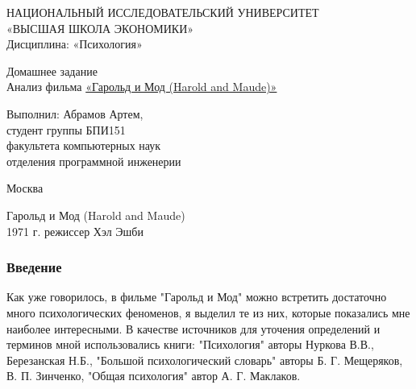 \documentclass[a4paper,12pt]{report} %
\begin{document}
\begin{titlepage}

\newpage

\begin{center}

{\large 
НАЦИОНАЛЬНЫЙ ИССЛЕДОВАТЕЛЬСКИЙ УНИВЕРСИТЕТ \\
«ВЫСШАЯ ШКОЛА ЭКОНОМИКИ» 	\\
Дисциплина: «Психология» 	\\
}

\vfill %

{\large 
	Домашнее задание \\
	Анализ фильма \underline{«Гарольд и Мод (Harold and Maude)»} 	\\
}

\bigskip

\vfill

\begin{flushright}
Выполнил: Абрамов Артем,\\
студент группы БПИ151 \\
факультета компьютерных наук \\
отделения программной инженерии \\
\end{flushright}

\vfill

Москва \number\year

\end{center}
\end{titlepage}

\newpage


\begin{center}
{\normalsize
 	Гарольд и Мод (Harold and Maude) \\
 	1971 г. режиссер Хэл Эшби \\
}
\end{center}

\subsubsection{Введение}

Как уже говорилось, в фильме "Гарольд и Мод" можно встретить достаточно много психологических феноменов, я выделил те из них, которые показались мне наиболее интересными. В качестве источников для уточения определений и терминов мной использовались книги:  "Психология" авторы Нуркова В.В., Березанская Н.Б., "Большой психологический словарь" авторы Б. Г. Мещеряков, В. П. Зинченко, "Общая психология" автор  А. Г. Маклаков.
\end{document}
